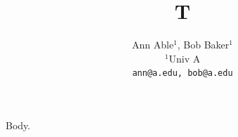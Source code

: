 \documentclass{article}
\author{Ann Able$^{1}$, Bob Baker$^{1}$\\ $^{1}$Univ A\\ \texttt{\small ann@a.edu, bob@a.edu}}
\title{T}
\begin{document}
\maketitle
Body.
\end{document}
